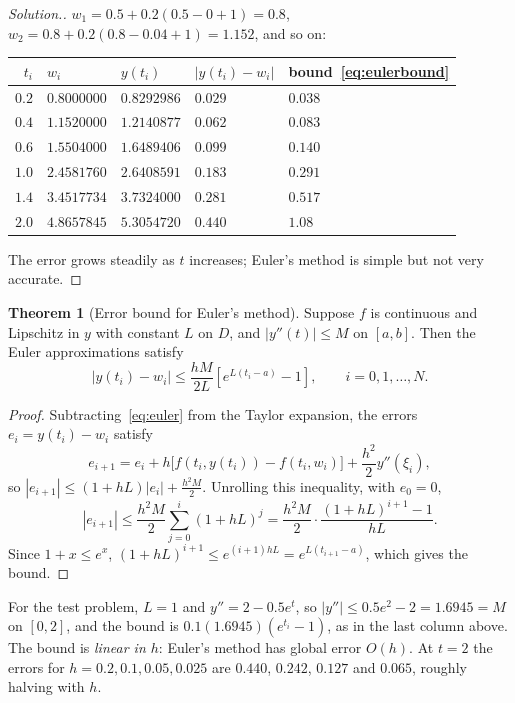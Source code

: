 \documentclass[11pt,a4paper]{article}
\numberwithin{equation}{section}
\theoremstyle{definition}
\newtheorem{thm}{Theorem}[subsection]
\newenvironment{solution}
  {\renewcommand{\qedsymbol}{}\begin{proof}[\textit{Solution}.]}
  {\end{proof}}
\begin{document}
\begin{solution}
$w_1 = 0.5+0.2(0.5-0+1) = 0.8$, $w_2 = 0.8+0.2(0.8-0.04+1) = 1.152$, and so on:
\begin{center}
\begin{tabular}{rllll}
\hline
$t_i$ & $w_i$ & $y(t_i)$ & $|y(t_i)-w_i|$ & bound~\eqref{eq:eulerbound}\\
\hline
$0.2$ & $0.8000000$ & $0.8292986$ & $0.029$ & $0.038$\\
$0.4$ & $1.1520000$ & $1.2140877$ & $0.062$ & $0.083$\\
$0.6$ & $1.5504000$ & $1.6489406$ & $0.099$ & $0.140$\\
$1.0$ & $2.4581760$ & $2.6408591$ & $0.183$ & $0.291$\\
$1.4$ & $3.4517734$ & $3.7324000$ & $0.281$ & $0.517$\\
$2.0$ & $4.8657845$ & $5.3054720$ & $0.440$ & $1.08$\\
\hline
\end{tabular}
\end{center}
The error grows steadily as $t$ increases; Euler's method is simple but not very accurate.
\end{solution}

\begin{thm}[Error bound for Euler's method]
\label{thm:eulerbound}
Suppose $f$ is continuous and Lipschitz in $y$ with constant $L$ on $D$, and $|y''(t)|\leq M$ on $[a,b]$. Then the Euler approximations
satisfy
\begin{equation}\label{eq:eulerbound}
|y(t_i)-w_i|\leq\frac{hM}{2L}\left[e^{L(t_i-a)}-1\right],\qquad i = 0,1,\dots,N .
\end{equation}
\end{thm}

\begin{proof}
Subtracting~\eqref{eq:euler} from the Taylor expansion, the errors $e_i = y(t_i)-w_i$ satisfy
$$e_{i+1} = e_i+h\bigl[f(t_i,y(t_i))-f(t_i,w_i)\bigr]+\frac{h^2}{2}y''(\xi_i),$$
so $|e_{i+1}|\leq(1+hL)|e_i|+\frac{h^2M}{2}$. Unrolling this inequality, with $e_0 = 0$,
$$|e_{i+1}|\leq\frac{h^2M}{2}\sum_{j=0}^{i}(1+hL)^j = \frac{h^2M}{2}\cdot\frac{(1+hL)^{i+1}-1}{hL} .$$
Since $1+x\leq e^x$, $(1+hL)^{i+1}\leq e^{(i+1)hL} = e^{L(t_{i+1}-a)}$, which gives the bound.
\end{proof}

For the test problem, $L = 1$ and $y'' = 2-0.5e^t$, so $|y''|\leq0.5e^2-2 = 1.6945 = M$ on $[0,2]$, and the bound is
$0.1(1.6945)(e^{t_i}-1)$, as in the last column above. The bound is \emph{linear in $h$}: Euler's method has global error $O(h)$. At $t = 2$
the errors for $h = 0.2, 0.1, 0.05, 0.025$ are $0.440$, $0.242$, $0.127$ and $0.065$, roughly halving with $h$.
\end{document}
